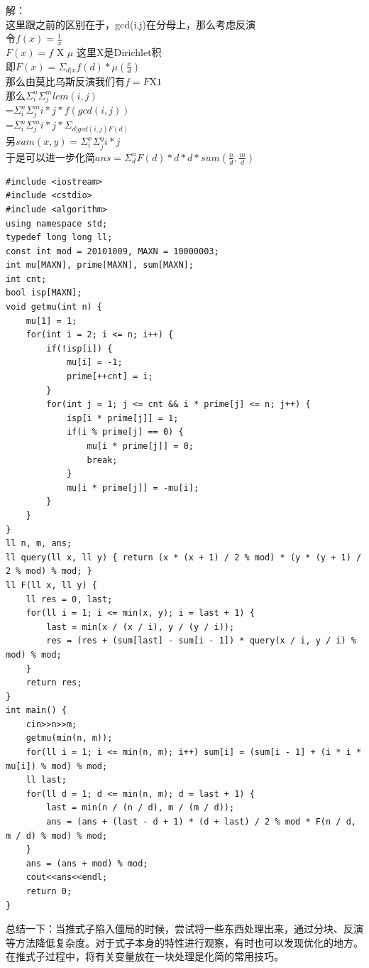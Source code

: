 \documentclass[10pt]{ctexart}
\begin{document}
{解：\\
这里跟之前的区别在于，gcd(i,j)在分母上，那么考虑反演\\
令$f(x) = \frac{1}{x}$\\
$F(x) = f $ X $\mu$ 这里X是Dirichlet积\\
即$F(x) = \Sigma_{d | x}f(d) * \mu(\frac{x}{d})$\\
那么由莫比乌斯反演我们有$f=F$X$1$\\
那么$\Sigma_i^n\Sigma_j^mlcm(i, j)$\\
=$\Sigma_i^n\Sigma_j^mi*j*f(gcd(i, j))$\\
=$\Sigma_i^n\Sigma_j^mi*j*\Sigma_{d|gcd(i, j)F(d)}$\\
另$sum(x, y) = \Sigma_i^x\Sigma_j^yi*j$\\
于是可以进一步化简$ans = \Sigma_d^nF(d) * d * d * sum(\frac{n}{d}, \frac{m}{d})$\\
\begin{lstlisting}
#include <iostream>
#include <cstdio>
#include <algorithm>
using namespace std;
typedef long long ll;
const int mod = 20101009, MAXN = 10000003;
int mu[MAXN], prime[MAXN], sum[MAXN];
int cnt;
bool isp[MAXN];
void getmu(int n) {
    mu[1] = 1;
    for(int i = 2; i <= n; i++) {
        if(!isp[i]) {
            mu[i] = -1;
            prime[++cnt] = i;
        }
        for(int j = 1; j <= cnt && i * prime[j] <= n; j++) {
            isp[i * prime[j]] = 1;
            if(i % prime[j] == 0) {
                mu[i * prime[j]] = 0;
                break;
            }
            mu[i * prime[j]] = -mu[i];
        }
    }
}
ll n, m, ans;
ll query(ll x, ll y) { return (x * (x + 1) / 2 % mod) * (y * (y + 1) / 2 % mod) % mod; }
ll F(ll x, ll y) {
    ll res = 0, last;
    for(ll i = 1; i <= min(x, y); i = last + 1) {
        last = min(x / (x / i), y / (y / i));
        res = (res + (sum[last] - sum[i - 1]) * query(x / i, y / i) % mod) % mod;
    }
    return res;
}
int main() {
    cin>>n>>m;
    getmu(min(n, m));
    for(ll i = 1; i <= min(n, m); i++) sum[i] = (sum[i - 1] + (i * i * mu[i]) % mod) % mod;
    ll last;
    for(ll d = 1; d <= min(n, m); d = last + 1) {
        last = min(n / (n / d), m / (m / d));
        ans = (ans + (last - d + 1) * (d + last) / 2 % mod * F(n / d, m / d) % mod) % mod;
    }
    ans = (ans + mod) % mod;
    cout<<ans<<endl;
    return 0;
}
\end{lstlisting}

总结一下：当推式子陷入僵局的时候，尝试将一些东西处理出来，通过分块、反演等方法降低复杂度。对于式子本身的特性进行观察，有时也可以发现优化的地方。\\
在推式子过程中，将有关变量放在一块处理是化简的常用技巧。\\

}
\end{document}

